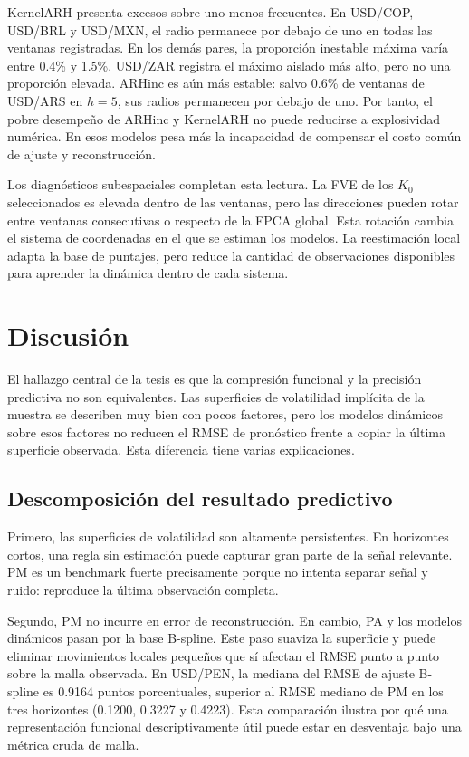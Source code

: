 \documentclass[a4paper,11pt]{article}
\newcommand{\SVIs}{superficies de volatilidad implícita}
\begin{document}
KernelARH presenta excesos sobre uno menos frecuentes. En USD/COP, USD/BRL y USD/MXN, el radio permanece por debajo de uno en todas las ventanas registradas. En los demás pares, la proporción inestable máxima varía entre 0.4\% y 1.5\%. USD/ZAR registra el máximo aislado más alto, pero no una proporción elevada. ARHinc es aún más estable: salvo 0.6\% de ventanas de USD/ARS en \(h=5\), sus radios permanecen por debajo de uno. Por tanto, el pobre desempeño de ARHinc y KernelARH no puede reducirse a explosividad numérica. En esos modelos pesa más la incapacidad de compensar el costo común de ajuste y reconstrucción.

Los diagnósticos subespaciales completan esta lectura. La FVE de los \(K_0\) seleccionados es elevada dentro de las ventanas, pero las direcciones pueden rotar entre ventanas consecutivas o respecto de la FPCA global. Esta rotación cambia el sistema de coordenadas en el que se estiman los modelos. La reestimación local adapta la base de puntajes, pero reduce la cantidad de observaciones disponibles para aprender la dinámica dentro de cada sistema.

\section{Discusión}

El hallazgo central de la tesis es que la compresión funcional y la precisión predictiva no son equivalentes. Las \SVIs{} de la muestra se describen muy bien con pocos factores, pero los modelos dinámicos sobre esos factores no reducen el RMSE de pronóstico frente a copiar la última superficie observada. Esta diferencia tiene varias explicaciones.

\subsection{Descomposición del resultado predictivo}

Primero, las superficies de volatilidad son altamente persistentes. En horizontes cortos, una regla sin estimación puede capturar gran parte de la señal relevante. PM es un benchmark fuerte precisamente porque no intenta separar señal y ruido: reproduce la última observación completa.

Segundo, PM no incurre en error de reconstrucción. En cambio, PA y los modelos dinámicos pasan por la base B-spline. Este paso suaviza la superficie y puede eliminar movimientos locales pequeños que sí afectan el RMSE punto a punto sobre la malla observada. En USD/PEN, la mediana del RMSE de ajuste B-spline es 0.9164 puntos porcentuales, superior al RMSE mediano de PM en los tres horizontes (0.1200, 0.3227 y 0.4223). Esta comparación ilustra por qué una representación funcional descriptivamente útil puede estar en desventaja bajo una métrica cruda de malla.
\end{document}
